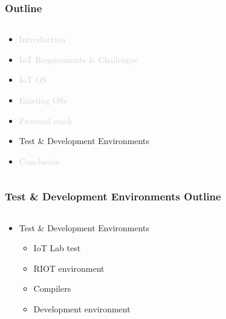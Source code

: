 \documentclass{beamer}
\begin{document}
\begin{frame}
	\frametitle{Outline}
	\begin{columns}[c]
		\begin{column}{30cm}
			\vspace{.1cm}
			\begin{itemize}
				\justifying
				\item \textcolor{LightGray}{Introduction}
				\item \textcolor{LightGray}{IoT Requirements \& Challenges}
				\item \textcolor{LightGray}{IoT OS}
				\item \textcolor{LightGray}{Existing OSs}
				\item \textcolor{LightGray}{Protocol stack}
				\item Test \& Development Environments
				\item \textcolor{LightGray}{Conclusion}
			\end{itemize}
		\end{column}
	\end{columns}
\end{frame}

\begin{frame}
	\frametitle{Test \& Development Environments Outline}
	\begin{columns}[c]
		\begin{column}{30cm}
			\vspace{.1cm}
			\begin{itemize}
				\justifying
				\item Test \& Development Environments
				\begin{itemize}
					\item IoT Lab test
					\item RIOT environment
					\item Compilers
					\item Development environment
				\end{itemize}
			\end{itemize}
		\end{column}
	\end{columns}
\end{frame}
\end{document}
